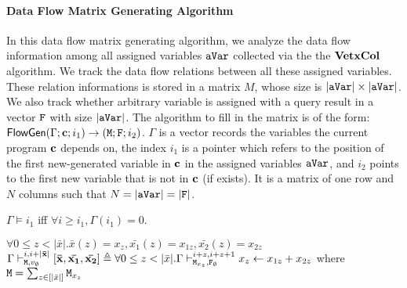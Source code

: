 \documentclass[a4paper,11pt]{article}
\begin{document}
\paragraph{Data Flow Matrix Generating Algorithm}
%
In this data flow matrix generating algorithm, we analyze the data flow information among all assigned variables $\mathtt{aVar}$ collected via the the $\bf{VetxCol}$ algorithm.
%
We track the data flow relations between all these assigned variables. These relation informations is stored in a matrix $M$, whose size is $|\mathtt{aVar}| \times |\mathtt{aVar}|$. 
We also track whether arbitrary variable is assigned with a query result in a vector $\mathtt{F}$ with size $|\mathtt{aVar}|$. 
%
The algorithm to fill in the matrix is of the form: $\mathsf{FlowGen}{(\Gamma ; \mathbf{{c}} ; i_1)}\to {(\ensuremath{\mathtt{M}}; \ensuremath{\mathtt{F}}; {i_2})}$. 
$\Gamma$ is a vector records the variables the current program $\mathbf{{c}}$ depends on, the index $i_1$ is a pointer which refers to the position of the first new-generated variable in $\mathbf{{c}}$ in the assigned variables $\mathtt{aVar}$, and $i_2$ points to the first new variable that is not in $\mathbf{{c}}$ (if exists). 
It is a matrix of one row and $N$ columns such that $N = |\mathtt{aVar}|=|\mathtt{F}|$.
%
%
\begin{defn}
$\Gamma \vDash i_1$ iff $\forall i \geq i_1, \Gamma(i_1)=0 $.  
\end{defn}
%
{$ \forall 0 \leq z < |\bar{x}|. \bar{x}(z) = x_z, \bar{x_1}(z) = x_{1z}, \bar{x_2}(z) = x_{2z} $ } \\
%
$ \Gamma \vdash_{
\mathtt{M}, v_{\emptyset}}^{i, i+ |\mathbf{{\bar{x}}}|} 
\mathbf{{[ \bar{x},\bar{x_1},\bar{x_2}   ]}} 
\triangleq { \forall 0 \leq z < |\bar{x}|.  
\Gamma \vdash_{\ensuremath{\mathtt{M}}_{x_z}, \ensuremath{\mathtt{F}}_{\emptyset}}^{i+z, i+z+1 } x_z \leftarrow x_{1z} + x_{2z} }$ 
where $\mathtt{M} = \sum_{z\in [|\bar{x}|] } \mathtt{M}_{x_z} $
%
\end{document}

